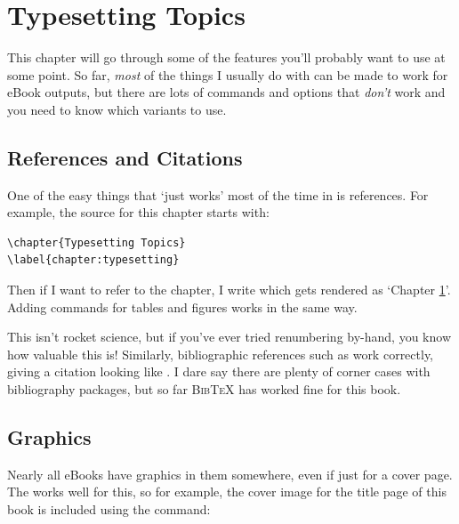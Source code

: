 \chapter{Typesetting Topics}
\label{chapter:typesetting}

This chapter will go through some of the \tex features you'll probably want to use at some point.
So far, {\em most} of the things I usually do with \tex can be made to work for eBook outputs,
but there are lots of commands and options that {\em don't} work and you need to know which
variants to use.

\section{References and Citations}

One of the easy things that `just works' most of the time in \latex is references. For example,
the \tex source for this chapter starts with:

\begin{verbatim}
\chapter{Typesetting Topics}
\label{chapter:typesetting}
\end{verbatim}

Then if I want to refer to the chapter, I write  which
gets rendered as `Chapter \ref{chapter:typesetting}'. Adding  commands for tables and figures
works in the same way.

This isn't rocket science, but if you've ever tried
renumbering by-hand, you know how valuable this is! Similarly, bibliographic references such as
 work correctly, giving a citation looking like \cite{knuth1984texbook}.
I dare say there are plenty of corner cases with bibliography packages, but so far \textsc{BibTeX} has worked
fine for this book.

\section{Graphics}

Nearly all eBooks have graphics in them somewhere, even if just for a cover page. 
The  works well for this, so for example, the cover image for the title page
of this book is included using the command:

